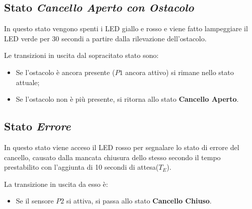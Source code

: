 \subsection{Stato \textit{Cancello Aperto con Ostacolo}}
In questo stato vengono spenti i LED giallo e rosso e viene fatto lampeggiare il LED verde per 30 secondi a partire dalla rilevazione dell'ostacolo.

\noindent Le transizioni in uscita dal sopracitato stato sono:
\begin{itemize}
    \item Se l'ostacolo è ancora presente ($P1$ ancora attivo) si rimane nello stato attuale;
    \item Se l'ostacolo non è più presente, si ritorna allo stato \textbf{Cancello Aperto}.
\end{itemize}


\subsection{Stato \textit{Errore}}
In questo stato viene acceso il LED rosso per segnalare lo stato di errore del cancello, causato dalla mancata chiusura dello stesso secondo il tempo prestabilito con l'aggiunta di 10 secondi di attesa($T_E$).

\noindent La transizione in uscita da esso è:
\begin{itemize}
    \item Se il sensore $P2$ si attiva, si passa allo stato \textbf{Cancello Chiuso}.
\end{itemize}